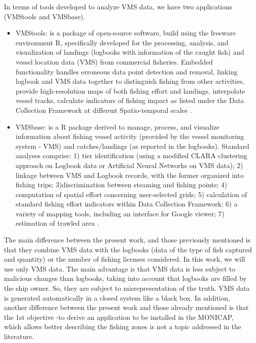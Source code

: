 In terms of tools developed to analyze VMS data, we have two applications (VMStools and VMSbase).
\begin{itemize}
\item VMStools: is a package of open-source software, build using the freeware environment R, specifically developed for the processing, analysis, and visualization of landings (logbooks with information of the caught fish) and vessel location data (VMS) from commercial fisheries. Embedded functionality handles erroneous data point detection and removal, linking logbook and VMS data together to distinguish fishing from other activities, provide high-resolution maps of both fishing effort and landings, interpolate vessel tracks, calculate indicators of fishing impact as listed under the Data Collection Framework at different Spatio-temporal scales \cite{DeporteVMStools}.


\item VMSbase: is a R package derived to manage, process, and visualize information about fishing vessel activity (provided by the vessel monitoring system - VMS) and catches/landings (as reported in the logbooks).
Standard analyses comprise: 1) tier identification (using a modified CLARA clustering approach on Logbook data or Artificial Neural
Networks on VMS data); 2) linkage between VMS and Logbook records, with the former organized into fishing trips; 3)discrimination between steaming and fishing points; 4) computation of spatial effort concerning user-selected grids; 5) calculation of standard fishing effort indicators within Data Collection Framework; 6) a variety of mapping tools, including an interface for Google viewer; 7) estimation of trawled area \cite{RussoVMSbase}.
\end{itemize}


The main difference between the present work, and those previously mentioned is that they combine VMS data with the logbooks (data of the type of fish captured and quantity) or the number of fishing licenses considered. 
In this work, we will use only VMS data. 
The main advantage is that VMS data is less subject to malicious changes than  logbooks, taking into account that logbooks are filled by the ship owner. So, they are subject to misrepresentation of the truth. VMS data is generated automatically in a closed system like a black box. 
In addition, another difference between the present work and those already mentioned is that the 1st objective -to derive an application to be installed in the MONICAP, which allows better describing the fishing zones is not a topic addressed in the literature.



